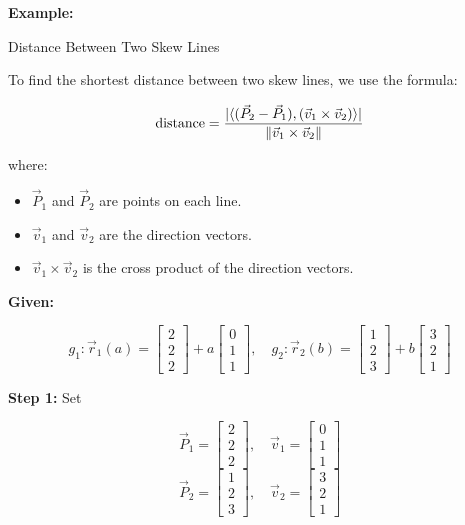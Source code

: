 \textbf{Example:}

Distance Between Two Skew Lines

To find the shortest distance between two skew lines, we use the formula:

\[
	\text{distance} = \frac{|\langle(\vec{P}_2 - \vec{P}_1), (\vec{v}_1 \times \vec{v}_2)\rangle|}{\left\| \vec{v}_1 \times \vec{v}_2 \right\|}
\]

where:

\begin{itemize}

	\item \(\vec{P}_1\) and \(\vec{P}_2\) are points on each line.

	\item \(\vec{v}_1\) and \(\vec{v}_2\) are the direction vectors.

	\item \(\vec{v}_1 \times \vec{v}_2\) is the cross product of the direction vectors.

\end{itemize}

\textbf{Given:}

\[
	g_1: \vec{r}_1(a) = \begin{bmatrix} 2 \\ 2 \\ 2 \end{bmatrix} + a \begin{bmatrix} 0 \\ 1 \\ 1 \end{bmatrix}, \quad
	g_2: \vec{r}_2(b) = \begin{bmatrix} 1 \\ 2 \\ 3 \end{bmatrix} + b \begin{bmatrix} 3 \\ 2 \\ 1 \end{bmatrix}
\]

\textbf{Step 1:} Set

\[
	\vec{P}_1 = \begin{bmatrix} 2 \\ 2 \\ 2 \end{bmatrix}, \quad \vec{v}_1 = \begin{bmatrix} 0 \\ 1 \\ 1 \end{bmatrix}
\]
\[
	\vec{P}_2 = \begin{bmatrix} 1 \\ 2 \\ 3 \end{bmatrix}, \quad \vec{v}_2 = \begin{bmatrix} 3 \\ 2 \\ 1 \end{bmatrix}
\]


